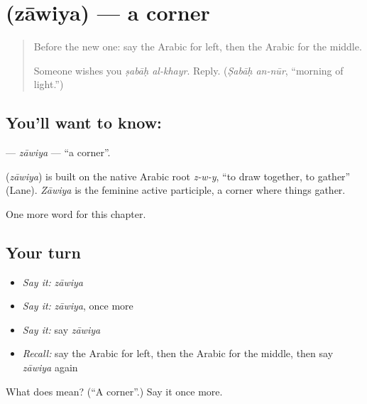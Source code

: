 \section[\texorpdfstring{\ar{زاوية} (zāwiya)}{زاوية (zāwiya)}]{ (zāwiya) — a corner}

\label{lesson:AR-C103-zawiya}



\begin{quote}
Before the new one: say the Arabic for left, then the Arabic for the middle.

Someone wishes you \emph{ṣabāḥ al-khayr}. Reply. (\emph{Ṣabāḥ an-nūr}, \textquotedblleft{}morning of light.\textquotedblright{})
\end{quote}

\subsection*{You'll want to know: }
\textbf{} — \emph{zāwiya} — \textquotedblleft{}a corner\textquotedblright{}.

\begin{cousinweb}
\textbf{} (\emph{zāwiya}) is built on the native Arabic root \emph{z-w-y}, \textquotedblleft{}to draw together, to gather\textquotedblright{} (Lane). \emph{Zāwiya} is the feminine active participle, a corner where things gather.
\end{cousinweb}

\begin{grammarlens}[title={What you've built}]
One more word for this chapter.
\end{grammarlens}

\subsection*{Your turn}
\begin{itemize}
\raggedright
  \item \emph{Say it:} \emph{zāwiya}
  \item \emph{Say it:} \emph{zāwiya}, once more
  \item \emph{Say it:} say \emph{zāwiya}
  \item \emph{Recall:} say the Arabic for left, then the Arabic for the middle, then say \emph{zāwiya} again
\end{itemize}

\begin{tcolorbox}[breakable,colback=teal!4,colframe=teal!35!black,title={Before you move on}]
What does  mean? (\textquotedblleft{}A corner\textquotedblright{}.) Say it once more.
\end{tcolorbox}
